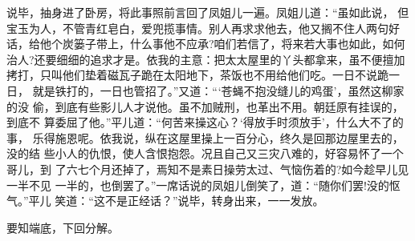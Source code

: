 说毕，抽身进了卧房，将此事照前言回了凤姐儿一遍。凤姐儿道：“虽如此说，
但宝玉为人，不管青红皂白，爱兜揽事情。别人再求求他去，他又搁不住人两句好
话，给他个炭篓子带上，什么事他不应承?咱们若信了，将来若大事也如此，如何
治人?还要细细的追求才是。依我的主意：把太太屋里的丫头都拿来，虽不便擅加
拷打，只叫他们垫着磁瓦子跪在太阳地下，茶饭也不用给他们吃。一日不说跪一日，
就是铁打的，一日也管招了。”又道：“‘苍蝇不抱没缝儿的鸡蛋’，虽然这柳家的没
偷，到底有些影儿人才说他。虽不加贼刑，也革出不用。朝廷原有挂误的，到底不
算委屈了他。”平儿道：“何苦来操这心？‘得放手时须放手’，什么大不了的事，
乐得施恩呢。依我说，纵在这屋里操上一百分心，终久是回那边屋里去的，没的结
些小人的仇恨，使人含恨抱怨。况且自己又三灾八难的，好容易怀了一个哥儿，到
了六七个月还掉了，焉知不是素日操劳太过、气恼伤着的?如今趁早儿见一半不见
一半的，也倒罢了。”一席话说的凤姐儿倒笑了，道：“随你们罢!没的怄气。”平儿
笑道：“这不是正经话？”说毕，转身出来，一一发放。

要知端底，下回分解。